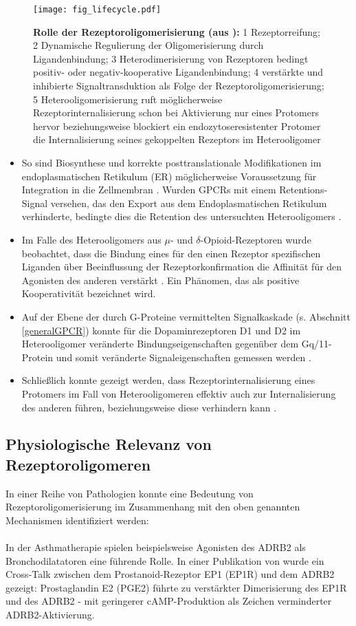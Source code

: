 \begin{figure}[htbp]
	\centering
    \texttt{[image: fig\_lifecycle.pdf]}
    \caption{\textbf{Rolle der Rezeptoroligomerisierung (aus \cite{Terrillon2004}):} 1 Rezeptorreifung; 2 Dynamische Regulierung der Oligomerisierung durch Ligandenbindung; 3 Heterodimerisierung von Rezeptoren bedingt positiv- oder negativ-kooperative Ligandenbindung; 4 verstärkte und inhibierte Signaltransduktion als Folge der Rezeptoroligomerisierung; 5 Heterooligomerisierung ruft möglicherweise Rezeptorinternalisierung schon bei Aktivierung nur eines Protomers hervor beziehungsweise blockiert ein endozytoseresistenter Protomer die Internalisierung seines gekoppelten Rezeptors im Heterooligomer} 
    \label{fig:lifecycle}
\end{figure}
\begin{itemize}
\item So sind Biosynthese und korrekte posttranslationale Modifikationen im endoplasmatischen Retikulum (ER) möglicherweise Voraussetzung für Integration in die Zellmembran \parencite{Salahpour2004}. Wurden GPCRs mit einem Retentions-Signal versehen, das den Export aus dem Endoplasmatischen Retikulum verhinderte, bedingte dies die Retention des untersuchten Heterooligomers \parencite{Zhu1998, Lee2000, Issafras2002, Floyd2003}.
\item Im Falle des Heterooligomers aus $\mu$- und $\delta$-Opioid-Rezeptoren wurde beobachtet, dass die Bindung eines für den einen Rezeptor spezifischen Liganden über Beeinflussung der Rezeptorkonfirmation die Affinität für den Agonisten des anderen verstärkt \parencite{Gomes2004}. Ein Phänomen, das als positive Kooperativität bezeichnet wird.
\item Auf der Ebene der durch G-Proteine vermittelten Signalkaskade (s. Abschnitt \ref{generalGPCR}) konnte für die Dopaminrezeptoren D1 und D2 im Heterooligomer veränderte Bindungseigenschaften gegenüber dem Gq/11-Protein und somit veränderte Signaleigenschaften gemessen werden \parencite{Rashid2007}.
\item Schließlich konnte gezeigt werden, dass Rezeptorinternalisierung eines Protomers im Fall von Heterooligomeren effektiv auch zur Internalisierung des anderen führen, beziehungsweise diese verhindern kann \parencite{Hillion2002, Milligan2010, Ward2011}. 
\end{itemize}

\subsection{Physiologische Relevanz von Rezeptoroligomeren}
In einer Reihe von Pathologien konnte eine Bedeutung von Rezeptoroligomerisierung im Zusammenhang mit den oben genannten Mechanismen identifiziert werden:
\\ \\
In der Asthmatherapie spielen beispielsweise Agonisten des ADRB2 als Bronchodilatatoren eine führende Rolle. In einer Publikation von \cite{McGraw2006} wurde ein Cross-Talk zwischen dem Prostanoid-Rezeptor EP1 (EP1R) und dem ADRB2 gezeigt: Prostaglandin E2 (PGE2) führte zu verstärkter Dimerisierung des EP1R und des ADRB2 - mit geringerer cAMP-Produktion als Zeichen verminderter ADRB2-Aktivierung.

